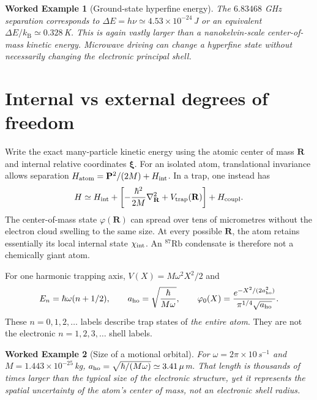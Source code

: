 \documentclass[11pt,a4paper]{article}
\newtheorem{example}{Worked Example}
\newcommand{\Rb}{^{87}\mathrm{Rb}}
\newcommand{\kb}{k_{\mathrm B}}
\newcommand{\ph}{\varphi}
\begin{document}
\begin{example}[Ground-state hyperfine energy]
The $6.83468$ GHz separation corresponds to $\Delta E=h\nu\simeq4.53\times10^{-24}\,$J or an equivalent $\Delta E/\kb\simeq0.328\,$K. This is again vastly larger than a nanokelvin-scale center-of-mass kinetic energy. Microwave driving can change a hyperfine state without necessarily changing the electronic principal shell.
\end{example}

\section{Internal vs external degrees of freedom}
Write the exact many-particle kinetic energy using the atomic center of mass $\mathbf R$ and internal relative coordinates $\boldsymbol\xi$. For an isolated atom, translational invariance allows separation $H_{\rm atom}=\mathbf P^2/(2M)+H_{\rm int}$. In a trap, one instead has
\begin{equation}
H\simeq H_{\rm int}+\left[-\frac{\hbar^2}{2M}\nabla_{\mathbf R}^2+V_{\rm trap}(\mathbf R)\right]+H_{\rm coupl}.
\end{equation}
The center-of-mass state $\ph(\mathbf R)$ can spread over tens of micrometres without the electron cloud swelling to the same size. At every possible $\mathbf R$, the atom retains essentially its local internal state $\chi_{\rm int}$. An $\Rb$ condensate is therefore not a chemically giant atom.

For one harmonic trapping axis, $V(X)=M\omega^2X^2/2$ and
\begin{equation}
E_n=\hbar\omega(n+1/2),\qquad a_{\rm ho}=\sqrt{\frac{\hbar}{M\omega}},\qquad
\ph_0(X)=\frac{e^{-X^2/(2a_{\rm ho}^2)}}{\pi^{1/4}\sqrt{a_{\rm ho}}}.
\end{equation}
These $n=0,1,2,\ldots$ labels describe trap states of \emph{the entire atom}. They are not the electronic $n=1,2,3,\ldots$ shell labels.

\begin{example}[Size of a motional orbital]
For $\omega=2\pi\times10\,$s$^{-1}$ and $M=1.443\times10^{-25}\,$kg, $a_{\rm ho}=\sqrt{\hbar/(M\omega)}\simeq3.41\,\mu$m. That length is thousands of times larger than the typical size of the electronic structure, yet it represents the spatial uncertainty of the atom's center of mass, not an electronic shell radius.
\end{example}
\end{document}

